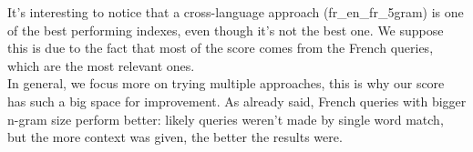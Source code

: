 It's interesting to notice that a cross-language approach (fr\_en\_fr\_5gram) is one of the best performing indexes, even though it's not the best one. We suppose this is due to the fact that most of the score comes from the French queries, which are the most relevant ones.\\
In general, we focus more on trying multiple approaches, this is why our score has such a big space for improvement. As already said, French queries with bigger n-gram size perform better: likely queries weren't made by single word match, but the more context was given, the better the results were.\\

